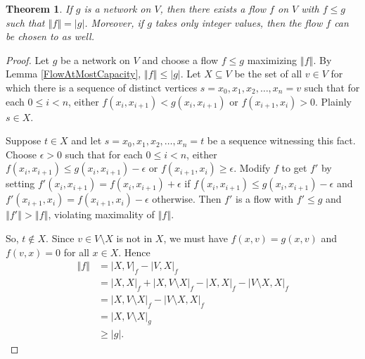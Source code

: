 \documentclass[openany]{tufte-book} %
\theoremstyle{plain}
\newtheorem{theorem}{Theorem}
\newcommand{\card}[1]{\left|#1\right|}
\newcommand{\size}[1]{\left\Vert#1\right\Vert}
\begin{document}
\begin{theorem}\label{MaxFlowMinCut}
If $g$ is a network on $V$, then there exists a flow $f$ on $V$ with $f \le g$ such that $\size{f} = \card{g}$.
Moreover, if $g$ takes only integer values, then the flow $f$ can be chosen to as well.
\end{theorem}
\begin{proof}
Let $g$ be a network on $V$ and choose a flow $f \le g$ maximizing $\size{f}$.  By Lemma \ref{FlowAtMostCapacity}, $\size{f} \le \card{g}$.
Let $X \subseteq V$ be the set of all $v \in V$ for which there is a sequence of distinct vertices $s = x_0, x_1, x_2, \ldots, x_n = v$ such that for each $0 \le i < n$, either
$f(x_i, x_{i+1}) < g(x_i, x_{i+1})$ or $f(x_{i+1}, x_i) > 0$.  Plainly $s \in X$.

Suppose $t \in X$ and let $s = x_0, x_1, x_2, \ldots, x_n = t$ be a sequence witnessing this fact.  
Choose $\epsilon > 0$ such that for each $0 \le i < n$, either $f(x_i, x_{i+1}) \le g(x_i, x_{i+1}) - \epsilon$ or $f(x_{i+1}, x_i) \ge \epsilon$.  Modify $f$ to get $f'$
by setting $f'(x_i, x_{i+1}) = f(x_i, x_{i+1}) + \epsilon$ if $f(x_i, x_{i+1}) \le g(x_i, x_{i+1}) - \epsilon$ and $f'(x_{i+1}, x_i) = f(x_{i+1}, x_i) -\epsilon$ otherwise.
Then $f'$ is a flow with $f' \le g$ and $\size{f'} > \size{f}$, violating maximality of $\size{f}$.

So, $t \not \in X$.  Since $v \in V \setminus X$ is not in $X$, we must have $f(x, v) = g(x,v)$ and $f(v,x) = 0$ for all $x \in X$.  Hence
\begin{align*}
\size{f} &= \card{X, V}_f - \card{V, X}_f \\
&= \card{X, X}_f + \card{X, V\setminus X}_f - \card{X, X}_f - \card{V\setminus X, X}_f\\
&= \card{X, V\setminus X}_f - \card{V\setminus X, X}_f\\
&= \card{X, V\setminus X}_g\\
&\ge \card{g}.
\end{align*}
\end{proof}
\end{document}
